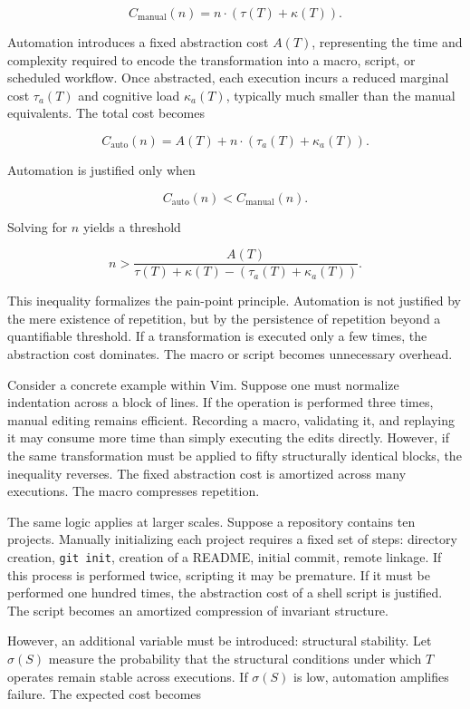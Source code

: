 \documentclass[12pt]{article}
\begin{document}
\[
C_{\text{manual}}(n) = n \cdot (\tau(T) + \kappa(T)).
\]

Automation introduces a fixed abstraction cost $A(T)$, representing the time and complexity required to encode the transformation into a macro, script, or scheduled workflow. Once abstracted, each execution incurs a reduced marginal cost $\tau_a(T)$ and cognitive load $\kappa_a(T)$, typically much smaller than the manual equivalents. The total cost becomes

\[
C_{\text{auto}}(n) = A(T) + n \cdot (\tau_a(T) + \kappa_a(T)).
\]

Automation is justified only when

\[
C_{\text{auto}}(n) < C_{\text{manual}}(n).
\]

Solving for $n$ yields a threshold

\[
n > \frac{A(T)}{\tau(T) + \kappa(T) - (\tau_a(T) + \kappa_a(T))}.
\]

This inequality formalizes the pain-point principle. Automation is not justified by the mere existence of repetition, but by the persistence of repetition beyond a quantifiable threshold. If a transformation is executed only a few times, the abstraction cost dominates. The macro or script becomes unnecessary overhead.

Consider a concrete example within Vim. Suppose one must normalize indentation across a block of lines. If the operation is performed three times, manual editing remains efficient. Recording a macro, validating it, and replaying it may consume more time than simply executing the edits directly. However, if the same transformation must be applied to fifty structurally identical blocks, the inequality reverses. The fixed abstraction cost is amortized across many executions. The macro compresses repetition.

The same logic applies at larger scales. Suppose a repository contains ten projects. Manually initializing each project requires a fixed set of steps: directory creation, \texttt{git init}, creation of a README, initial commit, remote linkage. If this process is performed twice, scripting it may be premature. If it must be performed one hundred times, the abstraction cost of a shell script is justified. The script becomes an amortized compression of invariant structure.

However, an additional variable must be introduced: structural stability. Let $\sigma(S)$ measure the probability that the structural conditions under which $T$ operates remain stable across executions. If $\sigma(S)$ is low, automation amplifies failure. The expected cost becomes
\end{document}
